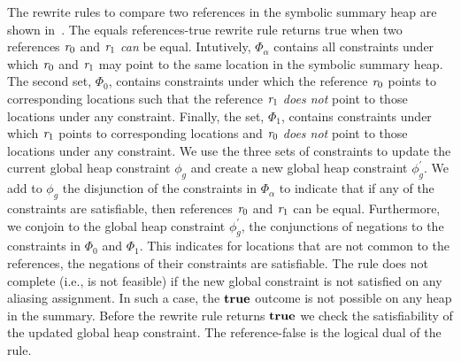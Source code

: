 The rewrite rules to compare two references in the symbolic summary
heap are shown in~. The equals references-true rewrite
rule returns true when two references $\emph{r}_0$ and $\emph{r}_1$
\emph{can} be equal. Intutively, $\Phi_\alpha$ contains all
constraints under which $\emph{r}_0$ and $\emph{r}_1$ may point to
the same location in the symbolic summary heap. The second set,
$\Phi_0$, contains constraints under which the reference $\emph{r}_0$
points to corresponding locations such that the reference
$\emph{r}_1$ \emph{does not} point to those locations under any
constraint. Finally, the set, $\Phi_1$, contains constraints under
which $\emph{r}_1$ points to corresponding locations and
$\emph{r}_0$ \emph{does not} point to those locations under any
constraint. We use the three sets of constraints to update the current
global heap constraint $\phi_g$ and create a new global heap
constraint $\phi_g^\prime$. We add to $\phi_g$ the disjunction of the
constraints in $\Phi_\alpha$ to indicate that if any of the
constraints are satisfiable, then references $\emph{r}_0$ and
$\emph{r}_1$ can be equal. Furthermore, we conjoin to the global heap
constraint $\phi_g^\prime$, the conjunctions of negations to the
constraints in $\Phi_0$ and $\Phi_1$. This indicates for locations
that are not common to the references, the negations of their
constraints are satisfiable. The rule does not complete (i.e., is not
feasible) if the new global constraint is not satisfied on any
aliasing assignment. In such a case, the $\textbf{true}$ outcome is not
possible on any heap in the summary. Before the rewrite rule returns
$\textbf{true}$ we check the satisfiability of the updated global heap
constraint. The reference-false is the logical dual of the rule.


